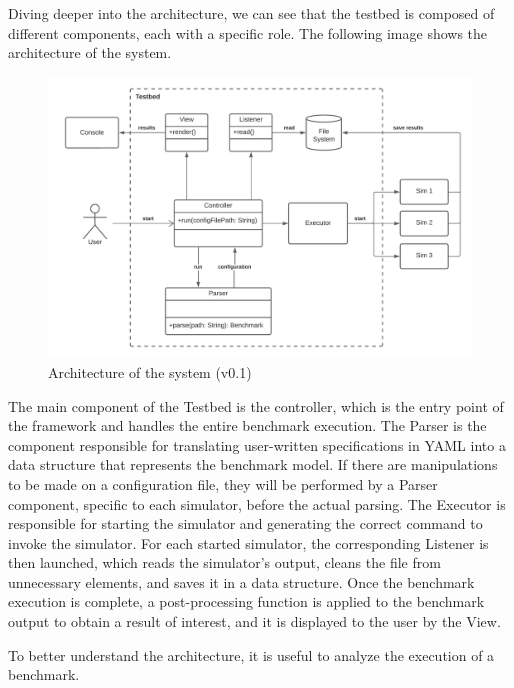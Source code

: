 \documentclass[12pt,a4paper,openright,twoside]{book}
\begin{document}
Diving deeper into the architecture, we can see that the testbed is composed of different components, each with a specific role.
The following image shows the architecture of the system.

\begin{figure}[h]
  \centering
  \includegraphics[width=\textwidth]{figures/testbed-architecture.png}
  \caption{Architecture of the system (v0.1)}
  \label{fig:random-image}
\end{figure}

The main component of the Testbed is the controller, which is the entry point of the framework and handles the entire benchmark execution.
The Parser is the component responsible for translating user-written specifications in YAML into a data structure that represents the benchmark model.
If there are manipulations to be made on a configuration file, they will be performed by a Parser component, specific to each simulator, before the actual parsing.
The Executor is responsible for starting the simulator and generating the correct command to invoke the simulator.
For each started simulator, the corresponding Listener is then launched, which reads the simulator's output, cleans the file from unnecessary elements, and saves it in a data structure.
Once the benchmark execution is complete, a post-processing function is applied to the benchmark output to obtain a result of interest, and it is displayed to the user by the View.

To better understand the architecture, it is useful to analyze the execution of a benchmark.
\end{document}
